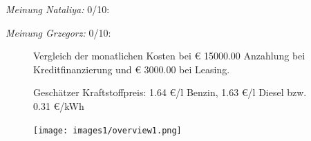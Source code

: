 \documentclass[landscape, DIV=99, 14pt]{scrartcl}
\begin{document}
\begin{small}
\emph{Meinung Nataliya:} 0/10: 
        
\emph{Meinung Grzegorz:} 0/10: 
\end{small}

\pagebreak



\pagebreak

\onecolumn
\begin{figure}
\centering
Vergleich der monatlichen Kosten bei \euro{} 15000.00 Anzahlung bei Kreditfinanzierung und \euro{} 3000.00 bei Leasing.

Gesch\"atzer Kraftstoffpreis: 1.64 \euro{}/l Benzin, 1.63 \euro{}/l Diesel bzw. 0.31 \euro{}/kWh


\vspace{1em}
\texttt{[image: images1/overview1.png]}
\end{figure}
\vfill 
\end{document}
